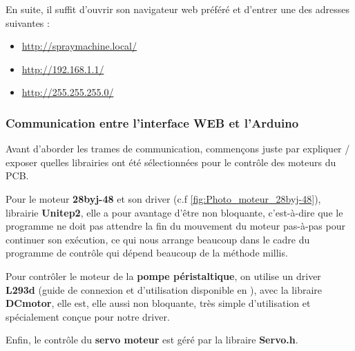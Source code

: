 En suite, il suffit d'ouvrir son navigateur web préféré et d'entrer une des adresses suivantes :
\begin{itemize}
    \item \url{http://spraymachine.local/}
    \item \url{http://192.168.1.1/}
    \item \url{http://255.255.255.0/}
\end{itemize}

\subsubsection{Communication entre l'interface WEB et l'Arduino}
Avant d'aborder les trames de communication, commençons juste par expliquer / exposer quelles librairies ont été sélectionnées
pour le contrôle des moteurs du PCB.

Pour le moteur \textbf{28byj-48} et son driver (c.f \autoref{fig:Photo_moteur_28byj-48}), librairie \textbf{Unitep2}\cite{Unistep2}\footnotemark {},
elle a pour avantage d'être non bloquante, c'est-à-dire que le programme ne doit pas attendre la fin du mouvement du moteur pas-à-pas pour continuer son exécution, ce qui nous arrange beaucoup dans le cadre du programme
de contrôle qui dépend beaucoup de la méthode millis.

Pour contrôler le moteur de la \textbf{pompe péristaltique}, on utilise un driver \textbf{L293d} (guide de connexion et d'utilisation disponible en \autocite{L293D_tuto}\footnotemark{}),
avec la libraire \textbf{DCmotor}\cite{DCmotor}\footnotemark{}, elle est, elle aussi non bloquante, très simple d'utilisation et spécialement conçue pour notre driver.

Enfin, le contrôle du \textbf{servo moteur} est géré par la libraire \textbf{Servo.h}\cite{Servo}\footnotemark{}.


